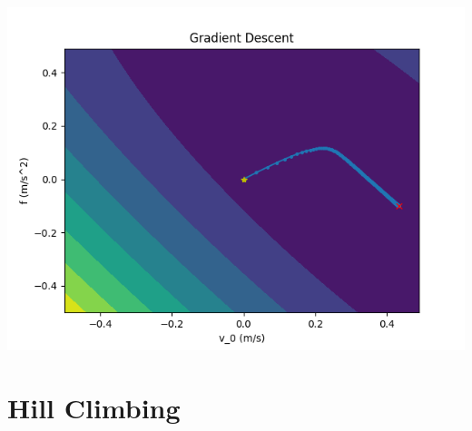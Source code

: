\documentclass[a4paper, 9pt]{article}
\newenvironment{Figure}
  {\par\medskip\noindent\minipage{\linewidth}}
  {\endminipage\par\medskip}
\theoremstyle{plain}
\theoremstyle{definition}
\theoremstyle{definition}
\theoremstyle{definition}
\begin{document}
\begin{multicols}{2}





\begin{Figure}
    \centering
    \includegraphics[width=\linewidth]
    {./../code/gradient_descent.png}
    \label{fig:gradient_descent}
\end{Figure}


\section*{Hill Climbing}


\end{multicols}
\end{document}
